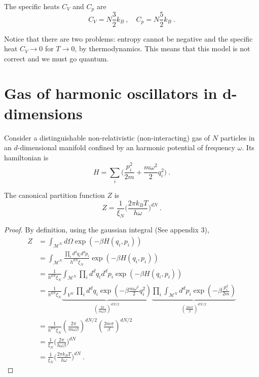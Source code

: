     The specific heats $C_V$ and $C_p$ are 
    \begin{equation*}
        C_V = N \frac{3}{2} k_B ~, \quad C_p = N \frac{5}{2} k_B ~. 
    \end{equation*}

    Notice that there are two problems: entropy cannot be negative and the specific heat $C_V \rightarrow 0$ for $T \rightarrow 0$, by thermodynamics. This means that this model is not correct and we must go quantum.
    
\section{Gas of harmonic oscillators in d-dimensions}

    Consider a distinguishable non-relativistic (non-interacting) gas of $N$ particles in an $d$-dimensional manifold confined by an harmonic potential of frequency $\omega$. Its hamiltonian is 
    \begin{equation*}
        H = \sum_i \Big ( \frac{p^2_i}{2m} + \frac{m \omega^2}{2} q_i^2 \Big ) ~.
    \end{equation*}

    The canonical partition function $Z$ is 
    \begin{equation*}
        Z = \frac{1}{\xi_N} \Big (\frac{2 \pi k_B T}{h \omega})^{dN} ~.
    \end{equation*}
    \begin{proof}
        By definition, using the gaussian integral (See appendix 3),
        \begin{equation*}
        \begin{aligned}
            Z & = \int_{\mathcal M^N} d\Omega \exp(- \beta H (q_i, p_i)) \\ & = \int_{\mathcal M^N} \frac{\prod_i d^d q_i d^d p_i}{h^{dN} \xi_N} \exp(- \beta H (q_i, p_i)) \\ & = \frac{1}{h^{dN} \xi_N} \int_{\mathcal M^N} \prod_i d^d q_i d^d p_i \exp(- \beta H (q_i, p_i)) \\ & = \frac{1}{h^{dN} \xi_N} \underbrace{\int_{ V^N} \prod_i d^d q_i \exp(- \beta \frac{m \omega^2}{2} q_i^2)}_{(\frac{2 \pi}{m \omega \beta})^{dN/2}} \underbrace{\prod_i \int_{\mathcal M^N} d^d p_i \exp(- \beta \frac{p^2_i}{2m})}_{(\frac{2 m \pi}{\beta})^{dN/2}} \\ & = \frac{1}{h^{dN} \xi_N} (\frac{2 \pi}{m \omega \beta})^{dN/2} (\frac{2 m \pi}{\beta})^{dN/2} \\ & = \frac{1}{\xi_N} \Big (\frac{2\pi}{h \omega \beta} \Big )^{dN} \\ & = \frac{1}{\xi_N} \Big (\frac{2 \pi k_B T}{h \omega} \Big )^{dN} ~.
        \end{aligned}
        \end{equation*}
    \end{proof}

